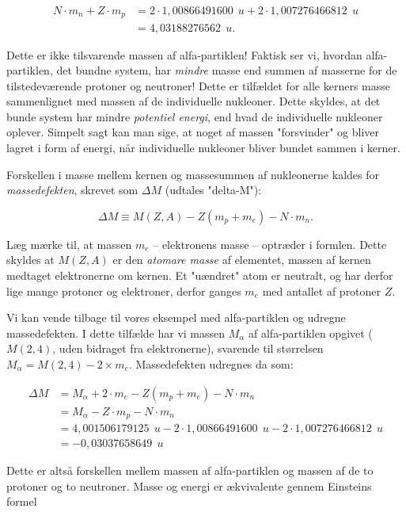 \begin{align*}
N \cdot m_n + Z \cdot m_p &= 2 \cdot 1,008 664 916 00~\SI{}{u} + 2 \cdot 1,007 276 466 812~\SI{}{u} \\
&= 4,031 88276562~\SI{}{u}.
\end{align*}  

Dette er ikke tilsvarende massen af alfa-partiklen! Faktisk ser vi, hvordan alfa-partiklen, det bundne system, har \emph{mindre} masse end summen af masserne for de tilstedeværende protoner og neutroner! Dette er tilfældet for alle kerners masse sammenlignet med massen af de individuelle nukleoner. Dette skyldes, at det bunde system har mindre \emph{potentiel energi}, end hvad de individuelle nukleoner oplever. Simpelt sagt kan man sige, at noget af massen "forsvinder" og bliver lagret i form af energi, når individuelle nukleoner bliver bundet sammen i kerner.

Forskellen i masse mellem kernen og massesummen af nukleonerne kaldes for \emph{massedefekten}, skrevet som $\Delta M$ (udtales "delta-M"):

\begin{equation}
\Delta M \equiv M(Z,A) - Z (m_p + m_e) - N \cdot m_n.
\label{eq:mass_excess}
\end{equation}

Læg mærke til, at massen $m_e$ -- elektronens masse -- optræder i formlen. Dette skyldes at $M(Z,A)$ er den \emph{atomare masse} af elementet, massen af kernen medtaget elektronerne om kernen. Et "uændret" atom er neutralt, og har derfor lige mange protoner og elektroner, derfor ganges $m_e$ med antallet af protoner $Z$.
 
Vi kan vende tilbage til vores eksempel med alfa-partiklen og udregne massedefekten. I dette tilfælde har vi massen $M_\alpha$ af alfa-partiklen opgivet ($M(2,4)$, uden bidraget fra elektronerne), svarende til størrelsen $M_\alpha=M(2,4)-2\times m_e$. Massedefekten udregnes da som:

\begin{align*}
\Delta M &= M_\alpha + 2\cdot m_e - Z(m_p + m_e) - N \cdot m_n \\
&= M_\alpha - Z \cdot m_p - N \cdot m_n \\
&= 4,001506179125~\SI{}{u} - 2 \cdot 1,008 664 916 00~\SI{}{u} - 2 \cdot 1,007 276 466 812~\SI{}{u} \\
&= -0,03037658649~\SI{}{u}
\end{align*}

Dette er altså forskellen mellem massen af alfa-partiklen og massen af de to protoner og to neutroner. Masse og energi er ækvivalente gennem Einsteins formel

